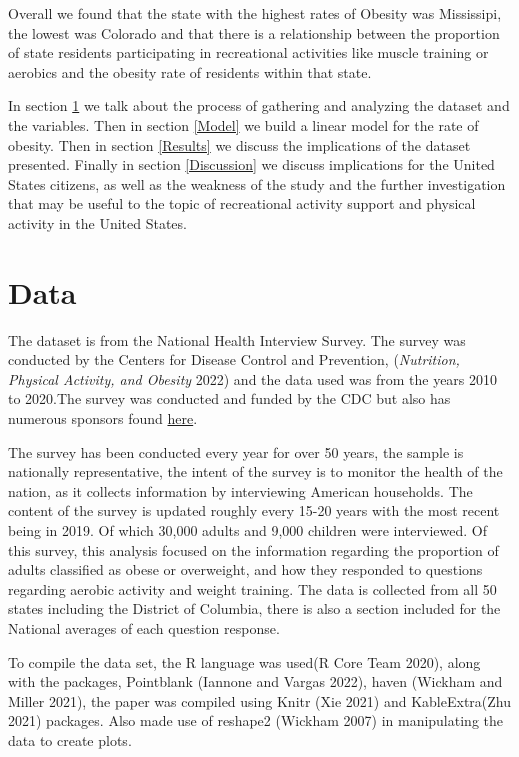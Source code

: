 \documentclass[
]{article}
\begin{document}
Overall we found that the state with the highest rates of Obesity was Mississipi, the lowest was Colorado and that there is a relationship between the proportion of state residents participating in recreational activities like muscle training or aerobics and the obesity rate of residents within that state.

In section \ref{Data} we talk about the process of gathering and analyzing the dataset and the variables. Then in section \ref{Model} we build a linear model for the rate of obesity. Then in section \ref{Results} we discuss the implications of the dataset presented. Finally in section \ref{Discussion} we discuss implications for the United States citizens, as well as the weakness of the study and the further investigation that may be useful to the topic of recreational activity support and physical activity in the United States.

\newpage

\hypertarget{Data}{%
\section{Data}\label{Data}}

The dataset is from the National Health Interview Survey. The survey was conducted by the Centers for Disease Control and Prevention, (\emph{Nutrition, Physical Activity, and Obesity} 2022) and the data used was from the years 2010 to 2020.The survey was conducted and funded by the CDC but also has numerous sponsors found \href{https://www.cdc.gov/nchs/nhis/supplements_cosponsors.htm}{here}.

The survey has been conducted every year for over 50 years, the sample is nationally representative, the intent of the survey is to monitor the health of the nation, as it collects information by interviewing American households. The content of the survey is updated roughly every 15-20 years with the most recent being in 2019. Of which 30,000 adults and 9,000 children were interviewed. Of this survey, this analysis focused on the information regarding the proportion of adults classified as obese or overweight, and how they responded to questions regarding aerobic activity and weight training. The data is collected from all 50 states including the District of Columbia, there is also a section included for the National averages of each question response.

To compile the data set, the R language was used(R Core Team 2020), along with the packages, Pointblank (Iannone and Vargas 2022), haven (Wickham and Miller 2021), the paper was compiled using Knitr (Xie 2021) and KableExtra(Zhu 2021) packages. Also made use of reshape2 (Wickham 2007) in manipulating the data to create plots.
\end{document}
